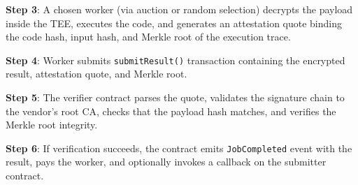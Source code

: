 \textbf{Step 3}: A chosen worker (via auction or random selection) decrypts the payload inside the TEE, executes the code, and generates an attestation quote binding the code hash, input hash, and Merkle root of the execution trace.

\textbf{Step 4}: Worker submits \texttt{submitResult()} transaction containing the encrypted result, attestation quote, and Merkle root.

\textbf{Step 5}: The verifier contract parses the quote, validates the signature chain to the vendor's root CA, checks that the payload hash matches, and verifies the Merkle root integrity.

\textbf{Step 6}: If verification succeeds, the contract emits \texttt{JobCompleted} event with the result, pays the worker, and optionally invokes a callback on the submitter contract.


